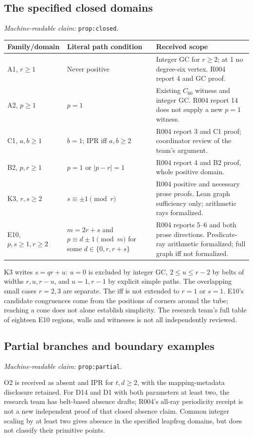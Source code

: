 \documentclass[11pt]{amsart}
\newcommand{\record}[1]{\nolinkurl{#1}}
\newcommand{\claimid}[1]{\par\nopagebreak\noindent\textit{Machine-readable claim:} \record{#1}.\par}
\theoremstyle{definition}\newtheorem{definition}{Definition}
\begin{document}
\subsection{The specified closed domains}\label{prop:closed}
\claimid{prop:closed}
\begin{center}\small
\begin{tabular}{p{}p{}p{}}\toprule
Family/domain & Literal path condition & Received scope\\\midrule
A1, $r\ge1$ & Never positive & Integer GC for $r\ge2$; at 1 no degree-six vertex. R004 report 4 and GC proof.\\
A2, $p\ge1$ & $p=1$ & Existing $C_{60}$ witness and integer GC. R004 report 14 does not supply a new $p=1$ witness.\\
C1, $a,b\ge1$ & $b=1$; IPR iff $a,b\ge2$ & R004 report 3 and C1 proof; coordinator review of the team's argument.\\
B2, $p,r\ge1$ & $p=1$ or $|p-r|=1$ & R004 report 4 and B2 proof, whole positive domain.\\
K3, $r,s\ge2$ & $s\equiv\pm1\pmod r$ & R004 positive and necessary prose proofs. Lean graph sufficiency only; arithmetic rays formalized.\\
E10, $p,s\ge1,r\ge2$ & $m=2r+s$ and $p\equiv d\pm1\pmod m$ for some $d\in\{0,r,r+s\}$ & R004 reports 5--6 and both prose directions. Predicate-ray arithmetic formalized; full graph iff not formalized.\\\bottomrule
\end{tabular}
\end{center}
K3 writes $s=qr+u$: $u=0$ is excluded by integer GC,
$2\le u\le r-2$ by belts of widths $r,u,r-u$, and $u=1,r-1$
by explicit simple paths. The overlapping small cases $r=2,3$ are
separate. The iff is not extended to $r=1$ or $s=1$. E10's candidate
congruences come from the positions of corners around the tube;
reaching a cone does not alone establish simplicity. The research
team's full table of eighteen E10 regions, walls and witnesses is not
all independently reviewed.

\subsection{Partial branches and boundary examples}\label{prop:partial}
\claimid{prop:partial}
O2 is received as absent and IPR for $t,d\ge2$, with the mapping-metadata
disclosure retained. For D14 and D1 with both parameters at least two,
the research team has belt-based absence drafts; R004's all-ray
periodicity receipt is not a new independent proof of that closed
absence claim. Common integer scaling by at least two gives absence
in the specified leapfrog domains, but does not classify their
primitive points.
\end{document}
